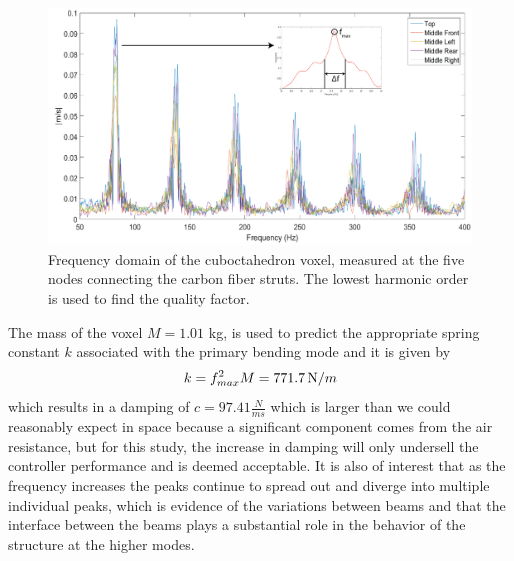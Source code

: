\documentclass[11pt]{ucthesis}
\begin{document}
\begin{figure}[h]
\centering
\includegraphics[width=0.75\linewidth]{Figures/FFTandQ.png}
\caption{Frequency domain of the cuboctahedron voxel, measured at the five nodes connecting the carbon fiber struts. The lowest harmonic order is used to find the quality factor.}
\label{fig:FFTandQ}
\end{figure}
The mass of the voxel $M=1.01$ kg, is used to predict the appropriate spring constant $k$ associated with the primary bending mode and it is given by
\begin{equation}
k = f_{max}^2 M = 771.7 \, {\mbox N/m}
\label{eqn:kfm}
\end{equation}
which results in a damping of $c = 97.41 \frac{N}{ms}$ which is larger than we could reasonably expect in space because a significant component comes from the air resistance, but for this study, the increase in damping will only undersell the controller performance and is deemed acceptable. It is also of interest that as the frequency increases the peaks continue to spread out and diverge into multiple individual peaks, which is evidence of the variations between beams and that the interface between the beams plays a substantial role in the behavior of the structure at the higher modes.
\end{document}
